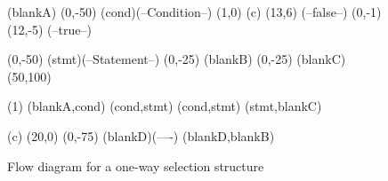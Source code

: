 




\begin {figure}

\Draw

\FcNode(blankA)
\Move(0,-50)
\DiamondNode(cond)(--Condition--)
{ \MoveToExit(1,0) \MarkGLoc(c) \Move(13,6) \Text(--false--) }
{ \MoveToExit(0,-1) \Move(12,-5) \Text(--true--) }


\Move(0,-50)
\RectNode(stmt)(--Statement--)
\Move(0,-25)
\FcNode(blankB)
\Move(0,-25)
\FcNode(blankC)
\Move(50,100)



\ArrowHeads(1)
\Edge (blankA,cond)
\Edge (cond,stmt)
\Edge (cond,stmt)
\Edge (stmt,blankC)

\MoveToLoc(c)
\Line(20,0)
\Line(0,-75)
\Node(blankD)(----)
\Edge(blankD,blankB)


\EndDraw


\caption {Flow diagram for a one-way selection structure}

\label {fig:oneWay}

\end {figure}


